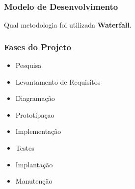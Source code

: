 \documentclass[../main.tex]{subfiles}
\begin{document}
\subsubsection{Modelo de Desenvolvimento}
Qual metodologia foi utilizada \textbf{Waterfall}.
\subsubsection{Fases do Projeto}
\begin{itemize}
    \item Pesquisa
    \item Levantamento de Requisitos
    \item Diagramação
    \item Prototipaçao
    \item Implementação
    \item Testes
    \item Implantação
    \item Manutenção
\end{itemize}
\end{document}

